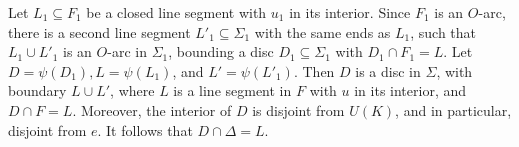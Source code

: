 Let $L_1 \subseteq F_1$ be a closed line segment with $u_1$ in its interior. Since $F_1$ is an $O$-arc, there is a second line segment $L'_1 \subseteq \Sigma_1$ with the same ends as $L_1$, such that $L_1 \cup L'_1$ is an $O$-arc in $\Sigma_1$, bounding a disc $D_1 \subseteq \Sigma_1$ with $D_1 \cap F_1 = L$. Let $D = \psi(D_1), L = \psi(L_1)$, and $L' = \psi(L'_1)$. Then $D$ is a disc in $\Sigma$, with boundary $L \cup L'$, where $L$ is a line segment in $F$ with $u$ in its interior, and $D \cap F = L$. Moreover, the interior of $D$ is disjoint from $U(K)$, and in particular, disjoint from $e$. It follows that $D \cap \Delta = L$.
